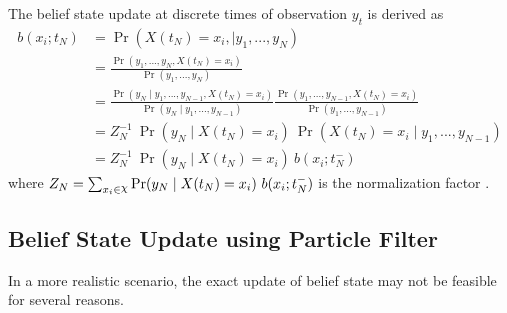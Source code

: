 The belief state update at discrete times of observation $ y_{t} $ is derived as 
\begin{align}
b(x_{i}; t_{N}) & = \operatorname{Pr}( X(t_{N}) = x_{i},\mid y_{1}, ..., y_{N}) \nonumber\\ & = \frac{\operatorname{Pr}(y_{1}, ..., y_{N}, X(t_{N}) = x_{i})}{\operatorname{Pr}(y_{1}, ..., y_{N})}  \nonumber\\ & = \frac{\operatorname{Pr}(y_{N} \mid y_{1}, ..., y_{N-1}, X(t_{N}) = x_{i})}{\operatorname{Pr}(y_{N} \mid y_{1}, ..., y_{N-1})} \frac{\operatorname{Pr}(y_{1}, ..., y_{N-1}, X(t_{N}) = x_{i})}{\operatorname{Pr}(y_{1}, ..., y_{N-1})}  \nonumber\\ & = Z_{N}^{-1} \ \operatorname{Pr}(y_{N} \mid X(t_{N})=x_{i})\ \operatorname{Pr}( X(t_{N}) = x_{i}\mid y_{1}, ..., y_{N-1})  \nonumber\\ & = Z_{N}^{-1}\ {\operatorname{Pr}(y_{N} \mid X(t_{N})=x_{i})}\ {b(x_{i}; t_{N}^{-})}
\end{align}
where $ Z_{N} = \sum_{x_{i}\in \rchi} \operatorname{Pr}(y_{N} \mid X(t_{N})=x_{i})\ b(x_{i}; t_{N}^{-}) $ is the normalization factor \cite{article}.

\subsection{Belief State Update using Particle Filter}
In a more realistic scenario, the exact update of belief state may not be feasible for several reasons. 


